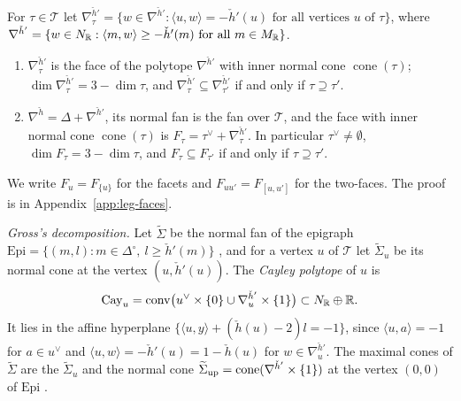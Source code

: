 \begin{lemma}[faces]\label{lem:faces}
For $\tau\in\mathcal T$ let $\nabla^{\check h'}_\tau=\{w\in\nabla^{\check h'}:\langle u,w\rangle=-\check h'(u)\text{ for all
vertices }u\text{ of }\tau\}$, where $\nabla^{\check h'}=\{w\in N_\mathbb R:\langle m,w\rangle\ge-\check h'(m)\text{ for all }m\in
M_\mathbb R\}$.
\begin{enumerate}
\item $\nabla^{\check h'}_\tau$ is the face of the polytope $\nabla^{\check h'}$ with inner normal cone
$\operatorname{cone}(\tau)$; $\dim\nabla^{\check h'}_\tau=3-\dim\tau$, and $\nabla^{\check h'}_\tau\subseteq\nabla^{\check
h'}_{\tau'}$ if and only if $\tau\supseteq\tau'$.
\item $\nabla^{\check h}=\Delta+\nabla^{\check h'}$, its normal fan is the fan over $\mathcal T$, and the face with inner
normal cone $\operatorname{cone}(\tau)$ is $F_\tau=\tau^\vee+\nabla^{\check h'}_\tau$. In particular $\tau^\vee\ne\emptyset$,
$\dim F_\tau=3-\dim\tau$, and $F_\tau\subseteq F_{\tau'}$ if and only if $\tau\supseteq\tau'$.
\end{enumerate}
\end{lemma}
We write $F_u=F_{\{u\}}$ for the facets and $F_{uu'}=F_{[u,u']}$ for the two-faces. The proof is in
Appendix~\ref{app:leg-faces}.

\emph{Gross's decomposition.} Let $\widetilde\Sigma$ be the normal fan of the epigraph $\mathrm{Epi}=\{(m,l):m\in\Delta^\circ,\
l\ge\check h'(m)\}$ \cite[Prop.~3.7]{Gross2005}, and for a vertex $u$ of $\mathcal T$ let $\widetilde\Sigma_u$ be its normal
cone at the vertex $(u,\check h'(u))$. The \emph{Cayley polytope} of $u$ is
\[
\mathrm{Cay}_u=\operatorname{conv}\bigl(u^\vee\times\{0\}\cup\nabla^{\check h'}_u\times\{1\}\bigr)\subset N_\mathbb R\oplus\mathbb R .
\]
It lies in the affine hyperplane $\{\langle u,y\rangle+(\check h(u)-2)l=-1\}$, since $\langle u,a\rangle=-1$ for $a\in u^\vee$
and $\langle u,w\rangle=-\check h'(u)=1-\check h(u)$ for $w\in\nabla^{\check h'}_u$. The maximal cones of $\widetilde\Sigma$ are
the $\widetilde\Sigma_u$ and the normal cone $\widetilde\Sigma_{\rm up}=\operatorname{cone}(\nabla^{\check h'}\times\{1\})$ at
the vertex $(0,0)$ of $\mathrm{Epi}$ \cite[Prop.~3.7]{Gross2005}.

